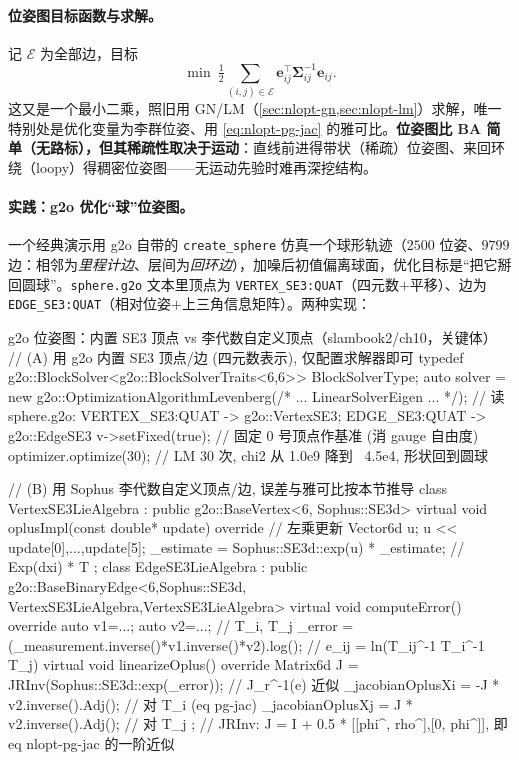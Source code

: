\paragraph{位姿图目标函数与求解。}\cite{gaoxiang2019slam14}
记 $\mathcal{E}$ 为全部边，目标
\begin{equation}
  \min\ \tfrac12\sum_{(i,j)\in\mathcal{E}}\mathbf{e}_{ij}^\top\boldsymbol{\Sigma}_{ij}^{-1}\mathbf{e}_{ij}.
  \label{eq:nlopt-pg-cost}
\end{equation}
这又是一个最小二乘，照旧用 GN/LM（\cref{sec:nlopt-gn,sec:nlopt-lm}）求解，唯一特别处是优化变量为李群位姿、用 \cref{eq:nlopt-pg-jac} 的雅可比。\textbf{位姿图比 BA 简单（无路标），但其稀疏性取决于运动}：直线前进得带状（稀疏）位姿图、来回环绕（loopy）得稠密位姿图——无运动先验时难再深挖结构。

\paragraph{实践：g2o 优化“球”位姿图。}\cite{gaoxiang2019slam14}
一个经典演示用 g2o 自带的 \texttt{create\_sphere} 仿真一个球形轨迹（$2500$ 位姿、$9799$ 边：相邻为\emph{里程计边}、层间为\emph{回环边}），加噪后初值偏离球面，优化目标是“把它掰回圆球”\cite{gaoxiang2019slam14}。\texttt{sphere.g2o} 文本里顶点为 \texttt{VERTEX\_SE3:QUAT}（四元数$+$平移）、边为 \texttt{EDGE\_SE3:QUAT}（相对位姿$+$上三角信息矩阵）。两种实现：

\begin{codebox}[C++]{g2o 位姿图：内置 SE3 顶点 vs 李代数自定义顶点（slambook2/ch10，关键体）}
// (A) 用 g2o 内置 SE3 顶点/边 (四元数表示), 仅配置求解器即可
typedef g2o::BlockSolver<g2o::BlockSolverTraits<6,6>> BlockSolverType;
auto solver = new g2o::OptimizationAlgorithmLevenberg(/* ... LinearSolverEigen ... */);
// 读 sphere.g2o: VERTEX_SE3:QUAT -> g2o::VertexSE3; EDGE_SE3:QUAT -> g2o::EdgeSE3
v->setFixed(true);            // 固定 0 号顶点作基准 (消 gauge 自由度)
optimizer.optimize(30);       // LM 30 次, chi2 从 1.0e9 降到 ~4.5e4, 形状回到圆球

// (B) 用 Sophus 李代数自定义顶点/边, 误差与雅可比按本节推导
class VertexSE3LieAlgebra : public g2o::BaseVertex<6, Sophus::SE3d> {
  virtual void oplusImpl(const double* update) override {        // 左乘更新
    Vector6d u; u << update[0],...,update[5];
    _estimate = Sophus::SE3d::exp(u) * _estimate;                // Exp(dxi) * T
  }
};
class EdgeSE3LieAlgebra : public g2o::BaseBinaryEdge<6,Sophus::SE3d,
                              VertexSE3LieAlgebra,VertexSE3LieAlgebra> {
  virtual void computeError() override {
    auto v1=...; auto v2=...;                                    // T_i, T_j
    _error = (_measurement.inverse()*v1.inverse()*v2).log();     // e_ij = ln(T_ij^-1 T_i^-1 T_j)
  }
  virtual void linearizeOplus() override {
    Matrix6d J = JRInv(Sophus::SE3d::exp(_error));               // J_r^{-1}(e) 近似
    _jacobianOplusXi = -J * v2.inverse().Adj();                  // 对 T_i  (eq pg-jac)
    _jacobianOplusXj =  J * v2.inverse().Adj();                  // 对 T_j
  }
};
// JRInv: J = I + 0.5 * [[phi^, rho^],[0, phi^]], 即 eq nlopt-pg-jac 的一阶近似
\end{codebox}

